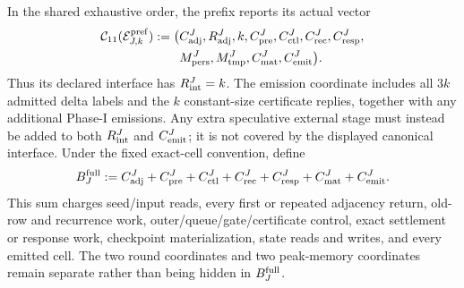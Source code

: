 \begin{definition}
In the shared exhaustive order, the prefix reports its actual vector
\begin{equation}
 \begin{aligned}
 \mathcal C_{11}(\mathcal E_{J,k}^{\rm pref}):=\bigl(&
 C_{\rm adj}^J,R_{\rm adj}^J,k,C_{\rm pre}^J,C_{\rm ctl}^J,
 C_{\rm rec}^J,C_{\rm resp}^J,\\
 &M_{\rm pers}^J,M_{\rm tmp}^J,C_{\rm mat}^J,C_{\rm emit}^J\bigr).
 \end{aligned}
 \label{eq:branch-caterpillar-composite-prefix-eleven-vector}
\end{equation}
Thus its declared interface has $R_{\rm int}^J=k$.  The emission coordinate
includes all $3k$ admitted delta labels and the $k$ constant-size certificate
replies, together with any additional Phase-I emissions.  Any extra
speculative external stage must instead be added to both $R_{\rm int}^J$ and
$C_{\rm emit}^J$; it is not covered by the displayed canonical interface.
Under the fixed exact-cell convention, define
\begin{equation}
 B_J^{\rm full}:=
 C_{\rm adj}^J+C_{\rm pre}^J+C_{\rm ctl}^J+C_{\rm rec}^J
 +C_{\rm resp}^J+C_{\rm mat}^J+C_{\rm emit}^J.
 \label{eq:branch-caterpillar-composite-prefix-full-work}
\end{equation}
This sum charges seed/input reads, every first or repeated adjacency return,
old-row and recurrence work, outer/queue/gate/certificate control, exact
settlement or response work, checkpoint materialization, state reads and
writes, and every emitted cell.  The two round coordinates and two peak-memory
coordinates remain separate rather than being hidden in $B_J^{\rm full}$.
\end{definition}


